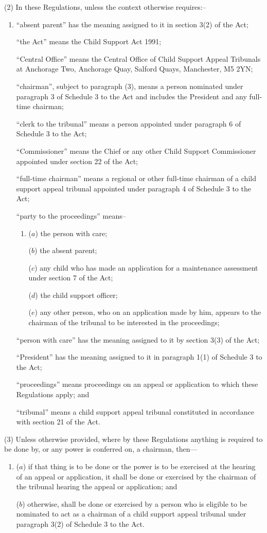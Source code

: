 \documentclass[a4paper]{article}
\begin{document}
(2) In these Regulations, unless the context otherwise requires:–
\begin{enumerate}\item[]
“absent parent” has the meaning assigned to it in section 3(2) of the Act;

“the Act” means the Child Support Act 1991;

“Central Office” means the Central Office of Child Support Appeal Tribunals at Anchorage Two, Anchorage Quay, Salford Quays, Manchester, M5 2YN;

“chairman”, subject to paragraph (3), means a person nominated under paragraph 3 of Schedule 3 to the Act and includes the President and any full-time chairman;

“clerk to the tribunal” means a person appointed under paragraph 6 of Schedule 3 to the Act;

“Commissioner” means the Chief or any other Child Support Commissioner appointed under section 22 of the Act;

“full-time chairman” means a regional or other full-time chairman of a child support appeal tribunal appointed under paragraph 4 of Schedule 3 to the Act;

“party to the proceedings” means–
\begin{enumerate}\item[]
($a$) the person with care;

($b$) the absent parent;

($c$) any child who has made an application for a maintenance assessment under section 7 of the Act;

($d$) the child support officer;

($e$) any other person, who on an application made by him, appears to the chairman of the tribunal to be interested in the proceedings;
\end{enumerate}

“person with care” has the meaning assigned to it by section 3(3) of the Act;

“President” has the meaning assigned to it in paragraph 1(1) of Schedule 3 to the Act;

“proceedings” means proceedings on an appeal or application to which these Regulations apply; and

“tribunal” means a child support appeal tribunal constituted in accordance with section 21 of the Act.
\end{enumerate}

(3) Unless otherwise provided, where by these Regulations anything is required to be done by, or any power is conferred on, a chairman, then---
\begin{enumerate}\item[]
($a$) if that thing is to be done or the power is to be exercised at the hearing of an appeal or application, it shall be done or exercised by the chairman of the tribunal hearing the appeal or application; and

($b$) otherwise, shall be done or exercised by a person who is eligible to be nominated to act as a chairman of a child support appeal tribunal under paragraph 3(2) of Schedule 3 to the Act.
\end{enumerate}
\end{document}
